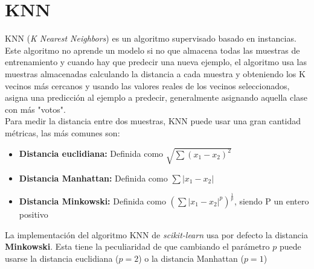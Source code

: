 \section{KNN}
\label{alg:knn}
KNN (\textit{K Nearest Neighbors}) es un algoritmo supervisado basado en instancias. Este algoritmo no aprende un modelo si no que almacena todas las muestras de entrenamiento y cuando hay que predecir una nueva ejemplo, el algoritmo usa las muestras almacenadas calculando la distancia a cada muestra y obteniendo los K vecinos más cercanos y usando las valores reales de los vecinos seleccionados, asigna una predicción al ejemplo a predecir, generalmente asignando aquella clase con más "votos".\\
\linebreak
Para medir la distancia entre dos muestras, KNN puede usar una gran cantidad métricas, las más comunes son:
\begin{itemize}
	\item \textbf{Distancia euclidiana:} Definida como $\sqrt{\sum(x_1 - x_2)^2}$
	\item \textbf{Distancia Manhattan:} Definida como $\sum|x_1 - x_2|$
	\item \textbf{Distancia Minkowski:} Definida como $(\sum|x_1 - x_2|^p)^{\frac{1}{p}}$, siendo P un entero positivo
\end{itemize}
La implementación del algoritmo KNN de \textit{scikit-learn} usa por defecto la distancia \textbf{Minkowski}. Esta tiene la peculiaridad de que cambiando el parámetro $p$ puede usarse la distancia euclidiana ($p=2$) o la distancia Manhattan ($p=1$)
